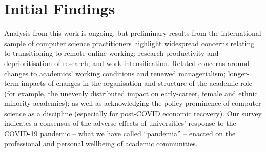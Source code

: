 \documentclass[manuscript,review]{acmart}
\begin{document}
\section{Initial Findings}

Analysis from this work is ongoing, but preliminary results from the
international sample of computer science practitioners highlight
widespread concerns relating to transitioning to remote online
working; research productivity and deprioritisation of research; and
work intensification. Related concerns around changes to academics’
working conditions and renewed managerialism; longer-term impacts of
changes in the organisation and structure of the academic role (for
example, the unevenly distributed impact on early-career, female and
ethnic minority academics); as well as acknowledging the policy
prominence of computer science as a discipline (especially for
post-COVID economic recovery). Our survey indicates a consensus of the
adverse effects of universities’ response to the COVID-19 pandemic --
what we have called ``pandemia'' -- enacted on the professional and
personal wellbeing of academic communities.













\end{document}
